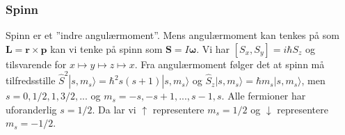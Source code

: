 \documentclass[a4paper, norsk, 8pt]{article}
\newcommand{\ket}[1] { |#1\rangle }
\newcommand{\commutator}[2]{ \left[ #1 , #2\right] }
\begin{document}
\begin{multicols*}{3}
\subsubsection*{\scriptsize Spinn} 
Spinn er et ''indre angulærmoment''. Mens angulærmoment kan tenkes på som $\mathbf{L}=\mathbf{r}\times\mathbf{p}$ kan vi tenke på spinn som $\mathbf{S}=I\mathbf{\omega}$. Vi har $\commutator{S_x}{S_y}=i\hbar S_z$ og tilsvarende for $x\mapsto y\mapsto z \mapsto x$. Fra angulærmoment følger det at spinn må tilfredsstille $\hat{S}^2\ket{s,m_s}=\hbar^2s(s+1)\ket{s,m_s}$ og $\hat{S}_z\ket{s,m_s}=\hbar m_s\ket{s,m_s}$, men $s=0,1/2,1,3/2,...$ og $m_s=-s,-s+1,...,s-1,s$. Alle fermioner har uforanderlig $s=1/2$. Da lar vi $\uparrow$ representere $m_s=1/2$ og $\downarrow$ representere $m_s=-1/2$. \\


\end{multicols*}
\end{document}
